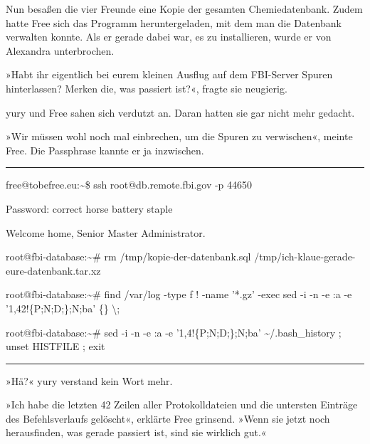 Nun besaßen die vier Freunde eine Kopie der gesamten Chemiedatenbank. Zudem hatte Free sich das Programm heruntergeladen, mit dem man die Datenbank verwalten konnte. Als er gerade dabei war, es zu installieren, wurde er von Alexandra unterbrochen.

»Habt ihr eigentlich bei eurem kleinen Ausflug auf dem FBI-Server Spuren hinterlassen? Merken die, was passiert ist?«, fragte sie neugierig.

yury und Free sahen sich verdutzt an. Daran hatten sie gar nicht mehr gedacht.

»Wir müssen wohl noch mal einbrechen, um die Spuren zu verwischen«, meinte Free. Die Passphrase kannte er ja inzwischen.

\noindent \parbox{\textwidth}{ \vspace{3ex} \hrule \vspace{3ex}

    \begin{footnotesize}
    \begin{ttfamily}

\noindent free@tobefree.eu:\textasciitilde{}\$ ssh root@db.remote.fbi.gov -p 44650

\noindent Password: correct horse battery staple

\noindent Welcome home, Senior Master Administrator.

\noindent root@fbi-database:\textasciitilde{}\# rm /tmp/kopie-der-datenbank.sql /tmp/ich-klaue-gerade-eure-datenbank.tar.xz

\noindent root@fbi-database:\textasciitilde{}\# find /var/log -type f ! -name '*.gz' -exec sed -i -n -e :a -e '1,42!\{P;N;D;\};N;ba' \{\} \textbackslash{};

\noindent root@fbi-database:\textasciitilde{}\# sed -i -n -e :a -e '1,4!\{P;N;D;\};N;ba' \textasciitilde{}/.bash\_history ; unset HISTFILE ; exit

    \end{ttfamily}
    \end{footnotesize}

\vspace{3ex} \hrule \vspace{3ex} }

»Hä?« yury verstand kein Wort mehr.

»Ich habe die letzten 42 Zeilen aller Protokolldateien und die untersten Einträge des Befehlsverlaufs gelöscht«, erklärte Free grinsend. »Wenn sie jetzt noch herausfinden, was gerade passiert ist, sind sie wirklich gut.«

